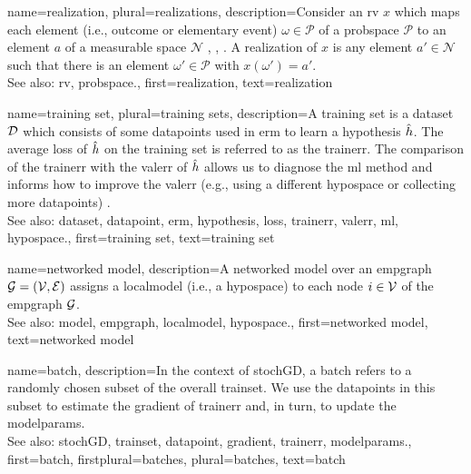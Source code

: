 	
{name={realization}, plural={realizations},
	description={Consider an \gls{rv} $x$ which maps each element 
		(i.e., outcome or elementary event) $\omega \in \mathcal{P}$ of a \gls{probspace} $\mathcal{P}$ 
		to an element $a$ of a measurable space $\mathcal{N}$ \cite{RudinBookPrinciplesMatheAnalysis}, \cite{BillingsleyProbMeasure}, \cite{HalmosMeasure}. 
		A realization of $x$ is any element $a' \in \mathcal{N}$ such that there is 
		an element $\omega' \in \mathcal{P}$ with $x(\omega') = a'$.
			\\
		See also: \gls{rv}, \gls{probspace}.}, 
	first={realization},
	text={realization}  
}

{name={training set}, plural={training sets},
	description={A training set is a \gls{dataset} $\mathcal{D}$ which consists of some \glspl{datapoint} used in \gls{erm} 
		to learn a \gls{hypothesis} $\hat{h}$. The average \gls{loss} of $\hat{h}$ on the 
		training set is referred to as the \gls{trainerr}. The comparison of the \gls{trainerr} with the 
		\gls{valerr} of $\hat{h}$ allows us to diagnose the \gls{ml} method and informs how to improve 
		the \gls{valerr} (e.g., using a different \gls{hypospace} or collecting more \glspl{datapoint}) \cite[Sec. 6.6]{MLBasics}.
			\\
		See also: \gls{dataset}, \gls{datapoint}, \gls{erm}, \gls{hypothesis}, \gls{loss}, \gls{trainerr}, \gls{valerr}, \gls{ml}, \gls{hypospace}.},
	first={training set},
	text={training set}  
}

{name={networked model},
 	description={A networked \gls{model} over an \gls{empgraph} $\mathcal{G} = \left( \mathcal{V},\mathcal{E} \right)$ assigns 
   		a \gls{localmodel} (i.e., a \gls{hypospace}) to each node $i \in \mathcal{V}$ of the \gls{empgraph} $\mathcal{G}$.
   		\\
		See also: \gls{model}, \gls{empgraph}, \gls{localmodel}, \gls{hypospace}.}, 
   first={networked model},
   text={networked model}  
}

{name={batch},
	description={In the context of \gls{stochGD}, a batch refers to a randomly 
		chosen subset of the overall \gls{trainset}. We use the \glspl{datapoint} in this subset 
		to estimate the \gls{gradient} of \gls{trainerr} and, in turn, to update the \gls{modelparams}.
			\\
		See also: \gls{stochGD}, \gls{trainset}, \gls{datapoint}, \gls{gradient}, \gls{trainerr}, \gls{modelparams}.}, 
 	first={batch},
 	firstplural={batches}, 
 	plural={batches}, 
 	text={batch}  
}

